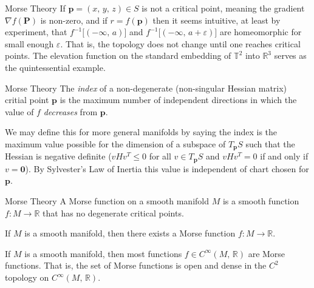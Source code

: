 \documentclass{beamer}
\begin{document}
    \begin{frame}{Morse Theory}
        If $\mathbf{p}=(x,\,y,\,z)\in{S}$ is not a critical point, meaning the
        gradient $\nabla{f}(\mathbf{P})$ is non-zero, and if $r=f(\mathbf{p})$
        then it seems intuitive, at least by experiment, that
        $f^{-1}\big[(-\infty,\,a)\big]$ and
        $f^{-1}\big[(-\infty,\,a+\varepsilon)\big]$ are homeomorphic for small
        enough $\varepsilon$. That is, the topology does not change until one
        reaches critical points. The elevation function on the standard
        embedding of $\mathbb{T}^{2}$ into $\mathbb{R}^{3}$ serves as the
        quintessential example.
    \end{frame}
    \begin{frame}{Morse Theory}
        The \textit{index} of a non-degenerate (non-singular Hessian matrix)
        critial point $\mathbf{p}$ is the maximum number of independent
        directions in which the value of $f$ \textit{decreases}
        from $\mathbf{p}$.
        \par\hfill\par
        We may define this for more general manifolds by saying the index is
        the maximum value possible for the dimension of a subspace of
        $T_{\mathbf{p}}S$ such that the Hessian is negative definite
        ($vHv^{T}\leq{0}$ for all $v\in{T}_{\mathbf{p}}S$ and
        $vHv^{T}=0$ if and only if $v=\mathbf{0}$). By Sylvester's Law of
        Inertia this value is independent of chart chosen for $\mathbf{p}$.
    \end{frame}
    \begin{frame}{Morse Theory}
        A Morse function on a smooth manifold $M$ is a smooth function
        $f:M\rightarrow\mathbb{R}$ that has no degenerate critical points.
        \begin{theorem}
            If $M$ is a smooth manifold, then there exists a Morse function
            $f:M\rightarrow\mathbb{R}$.
        \end{theorem}
        \begin{theorem}
            If $M$ is a smooth manifold, then most functions
            $f\in{C}^{\infty}(M,\,\mathbb{R})$ are Morse functions.
            That is, the set of Morse functions is open and dense in the
            $C^{2}$ topology on $C^{\infty}(M,\,\mathbb{R})$.
        \end{theorem}
    \end{frame}
\end{document}
